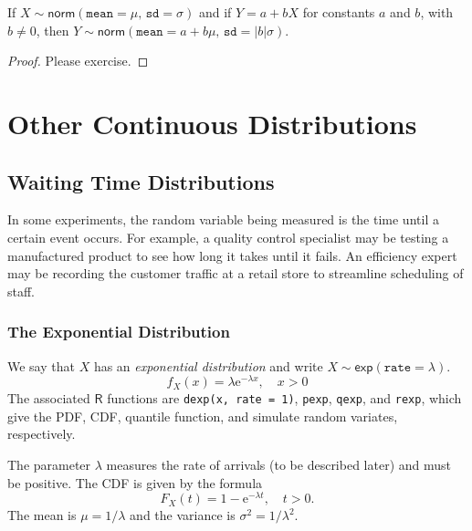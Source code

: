 \begin{fact}
\label{fac-lin-trans-norm-is-norm}
If \(X\sim\mathsf{norm}(\mathtt{mean}=\mu,\,\mathtt{sd}=\sigma)\) and if \(Y=a+bX\) for constants \(a\) and \(b\), with \(b\neq0\), then \(Y\sim\mathsf{norm}(\mathtt{mean}=a+b\mu,\,\mathtt{sd}=|b|\sigma)\).
\end{fact}

\begin{proof}
Please exercise.
\end{proof}

\section{Other Continuous Distributions}
\label{sec-6-5}

\subsection{Waiting Time Distributions}
\label{sec-6-5-1}

In some experiments, the random variable being measured is the time
until a certain event occurs. For example, a quality control
specialist may be testing a manufactured product to see how long it
takes until it fails. An efficiency expert may be recording the
customer traffic at a retail store to streamline scheduling of staff.

\subsubsection{The Exponential Distribution}
\label{sec-6-5-1-1}

We say that \(X\) has an \emph{exponential distribution} and write
\(X\sim\mathsf{exp}(\mathtt{rate}=\lambda)\).
\begin{equation}
f_{X}(x)=\lambda\mathrm{e}^{-\lambda x},\quad x>0
\end{equation}
The associated \(\mathsf{R}\) functions are \texttt{dexp(x, rate = 1)},
\texttt{pexp}, \texttt{qexp}, and \texttt{rexp}, which give the PDF, CDF, quantile
function, and simulate random variates, respectively.

The parameter \(\lambda\) measures the rate of arrivals (to be
described later) and must be positive. The CDF is given by the formula
\begin{equation}
F_{X}(t)=1-\mathrm{e}^{-\lambda t},\quad t>0.
\end{equation}
The mean is \(\mu=1/\lambda\) and the variance is
\(\sigma^{2}=1/\lambda^{2}\).

